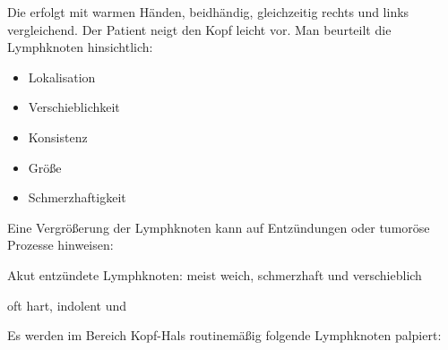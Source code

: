 


{Die  erfolgt  mit warmen
Händen, beidhändig, gleichzeitig rechts und links
vergleichend. Der Patient neigt den Kopf leicht vor.
Man beurteilt die Lymphknoten hinsichtlich:

\begin{itemize}
  \item Lokalisation
  \item Verschieblichkeit
  \item Konsistenz
  \item Größe
  \item Schmerzhaftigkeit
\end{itemize}

\noindent Eine Vergrößerung der Lymphknoten kann
auf Entzündungen oder tumoröse Prozesse hinweisen:

\begin{compactitem}
  \item Akut entzündete Lymphknoten: meist weich, schmerzhaft und
  verschieblich
  \item {} oft hart, indolent und
\end{compactitem}
}{%
\begin{PkuBefunde}[]
  \item[\SymbolPkuNormal] 
  \item[\SymbolPkuPathologisch]
\end{PkuBefunde}
}{}{}{}



\bigskip

Es werden im Bereich Kopf-Hals routinemäßig folgende Lymphknoten
palpiert:

